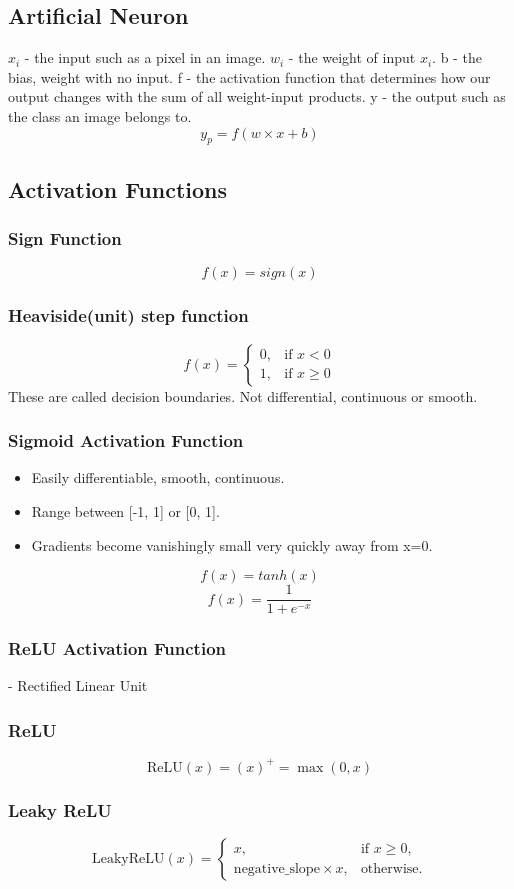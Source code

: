 \documentclass[11pt, english]{article}
\begin{document}
\subsection{Artificial Neuron}
$x_i$ - the input such as a pixel in an image.
$w_i$ - the weight of input $x_i$.
b - the bias, weight with no input.
f - the activation function that determines how our output changes with the sum of all weight-input products.
y - the output such as the class an image belongs to.
\[y_p = f(w\times x+b)\]
\subsection{Activation Functions}
\subsubsection{Sign Function}
\[f(x) = sign(x)\]
\subsubsection{Heaviside(unit) step function}
\[f(x) =
\begin{cases} 
0, & \text{if } x < 0 \\
1, & \text{if } x \geq 0
\end{cases}\]
These are called decision boundaries. Not differential, continuous or smooth.

\subsubsection{Sigmoid Activation Function}
\begin{itemize}
    \item Easily differentiable, smooth, continuous.
    \item Range between [-1, 1] or [0, 1].
    \item Gradients become vanishingly small very quickly away from x=0.
\end{itemize}
\[f(x) = tanh(x)\]
\[f(x) = \frac{1}{1+e^{-x}}\]
\subsubsection{ReLU Activation Function}- Rectified Linear Unit
\subsubsection*{ReLU}
\[
\text{ReLU}(x) = (x)^+ = \max(0, x)
\]

\subsubsection*{Leaky ReLU}
\[
\text{LeakyReLU}(x) = 
\begin{cases} 
x, & \text{if } x \geq 0, \\
\text{negative\_slope} \times x, & \text{otherwise.}
\end{cases}
\]
\end{document}

